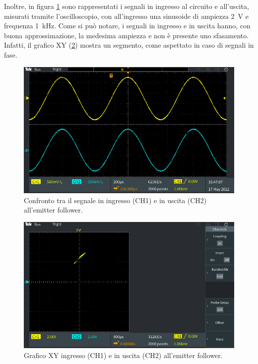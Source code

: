 Inoltre, in figura \ref{fig:emitterfollwer_v2_AC} sono rappresentati i segnali in ingresso al circuito e all'uscita, misurati tramite l'oscilloscopio, con all'ingresso una sinusoide di ampiezza \SI{2}{\volt} e frequenza \SI{1}{\kilo\hertz}. Come si può notare, i segnali in ingresso e in uscita hanno, con buona approssimazione, la medesima ampiezza e non è presente uno sfasamento. Infatti, il grafico XY (\Fig\ref{fig:emitterfollwer_v2_XY}) mostra un segmento, come aspettato in caso di segnali in fase.
\begin{figure}[h!]
	\centering
	\includegraphics[width=0.8\linewidth]{./ImageFiles/Laboratorio 2/TEK00023}
	\caption{Confronto tra il segnale in ingresso (CH1) e in uscita (CH2) all'emitter follower.}
	\label{fig:emitterfollwer_v2_AC}
\end{figure}
\begin{figure}[h!]
	\centering
	\includegraphics[width=0.8\linewidth]{./ImageFiles/Laboratorio 3/TEK00001}
	\caption{Grafico XY ingresso (CH1) e in uscita (CH2) all'emitter follower.}
	\label{fig:emitterfollwer_v2_XY}
\end{figure}




